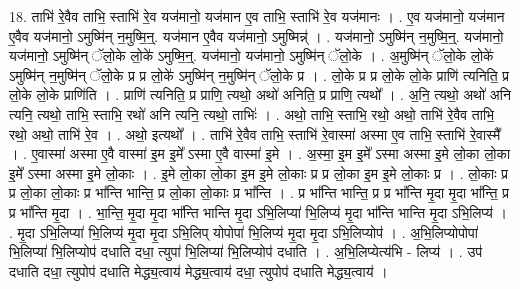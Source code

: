 \documentclass[17pt]{extarticle}
\begin{document}
18. ताभि॑ रे॒वैव ताभि॒ स्ताभि॑ रे॒व यज॑मानो॒ यज॑मान ए॒व ताभि॒ स्ताभि॑ रे॒व यज॑मानः । . ए॒व यज॑मानो॒ यज॑मान ए॒वैव यज॑मानो॒ ऽमुष्मि॑न् न॒मुष्मि॒न्॒. यज॑मान ए॒वैव यज॑मानो॒ ऽमुष्मिन्न्॑ । . यज॑मानो॒ ऽमुष्मि॑न् न॒मुष्मि॒न्॒. यज॑मानो॒ यज॑मानो॒ ऽमुष्मि॑न् ॅलो॒के लो॒के॑ ऽमुष्मि॒न्॒. यज॑मानो॒ यज॑मानो॒ ऽमुष्मि॑न् ॅलो॒के । . अ॒मुष्मि॑न् ॅलो॒के लो॒के॑ ऽमुष्मि॑न् न॒मुष्मि॑न् ॅलो॒के प्र प्र लो॒के॑ ऽमुष्मि॑न् न॒मुष्मि॑न् ॅलो॒के प्र । . लो॒के प्र प्र लो॒के लो॒के प्राणि॑ त्यनिति॒ प्र लो॒के लो॒के प्राणि॑ति । . प्राणि॑ त्यनिति॒ प्र प्राणि॒ त्यथो॒ अथो॑ अनिति॒ प्र प्राणि॒ त्यथो᳚ । . अ॒नि॒ त्यथो॒ अथो॑ अनि त्यनि॒ त्यथो॒ ताभि॒ स्ताभि॒ रथो॑ अनि त्यनि॒ त्यथो॒ ताभिः॑ । . अथो॒ ताभि॒ स्ताभि॒ रथो॒ अथो॒ ताभि॑ रे॒वैव ताभि॒ रथो॒ अथो॒ ताभि॑ रे॒व । . अथो॒ इत्यथो᳚ । . ताभि॑ रे॒वैव ताभि॒ स्ताभि॑ रे॒वास्मा॑ अस्मा ए॒व ताभि॒ स्ताभि॑ रे॒वास्मै᳚ । . ए॒वास्मा॑ अस्मा ए॒वै वास्मा॑ इ॒म इ॒मे᳚ ऽस्मा ए॒वै वास्मा॑ इ॒मे । . अ॒स्मा॒ इ॒म इ॒मे᳚ ऽस्मा अस्मा इ॒मे लो॒का लो॒का इ॒मे᳚ ऽस्मा अस्मा इ॒मे लो॒काः । . इ॒मे लो॒का लो॒का इ॒म इ॒मे लो॒काः प्र प्र लो॒का इ॒म इ॒मे लो॒काः प्र । . लो॒काः प्र प्र लो॒का लो॒काः प्र भा᳚न्ति भान्ति॒ प्र लो॒का लो॒काः प्र भा᳚न्ति । . प्र भा᳚न्ति भान्ति॒ प्र प्र भा᳚न्ति मृ॒दा मृ॒दा भा᳚न्ति॒ प्र प्र भा᳚न्ति मृ॒दा । . भा॒न्ति॒ मृ॒दा मृ॒दा भा᳚न्ति भान्ति मृ॒दा ऽभि॒लिप्या॑ भि॒लिप्य॑ मृ॒दा भा᳚न्ति भान्ति मृ॒दा ऽभि॒लिप्य॑ । . मृ॒दा ऽभि॒लिप्या॑ भि॒लिप्य॑ मृ॒दा मृ॒दा ऽभि॒लिप् योपोपा॑ भि॒लिप्य॑ मृ॒दा मृ॒दा ऽभि॒लिप्योप॑ । . अ॒भि॒लिप्योपोपा॑ भि॒लिप्या॑ भि॒लिप्योप॑ दधाति दधा॒ त्युपा॑ भि॒लिप्या॑ भि॒लिप्योप॑ दधाति । . अ॒भि॒लिप्येत्य॑भि - लिप्य॑ । . उप॑ दधाति दधा॒ त्युपोप॑ दधाति मेद्ध्य॒त्वाय॑ मेद्ध्य॒त्वाय॑ दधा॒ त्युपोप॑ दधाति मेद्ध्य॒त्वाय॑ । \newline
\end{document}
